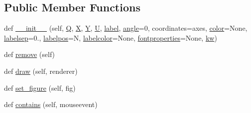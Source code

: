 \subsection*{Public Member Functions}
\begin{DoxyCompactItemize}
\item 
def \hyperlink{classmatplotlib_1_1quiver_1_1QuiverKey_a0516c2e91dcf94329df812e66b135a26}{\+\_\+\+\_\+init\+\_\+\+\_\+} (self, \hyperlink{classmatplotlib_1_1quiver_1_1QuiverKey_a87241e8441235ea44da1e26fa249c67f}{Q}, \hyperlink{classmatplotlib_1_1quiver_1_1QuiverKey_a677b96d69627db6cf8271ace161e4920}{X}, \hyperlink{classmatplotlib_1_1quiver_1_1QuiverKey_a79d4345f46bc99ce0c3d11cd1001c503}{Y}, \hyperlink{classmatplotlib_1_1quiver_1_1QuiverKey_a24e4cdf1a8fe12f3a1da49dd55dd614c}{U}, \hyperlink{classmatplotlib_1_1quiver_1_1QuiverKey_a5f746ef608190ecafe748ca3a6e79010}{label}, \hyperlink{classmatplotlib_1_1quiver_1_1QuiverKey_ab781e7037ad3d4d853fd80862f87841a}{angle}=0, coordinates=\textquotesingle{}axes\textquotesingle{}, \hyperlink{classmatplotlib_1_1quiver_1_1QuiverKey_a43b0eb9bfaf8244e74093582cc060410}{color}=None, \hyperlink{classmatplotlib_1_1quiver_1_1QuiverKey_a3e3c2f5f406415fcc575f1cb73545256}{labelsep}=0., \hyperlink{classmatplotlib_1_1quiver_1_1QuiverKey_a13fa5350971641227ee0278a9da4690f}{labelpos}=\textquotesingle{}N\textquotesingle{}, \hyperlink{classmatplotlib_1_1quiver_1_1QuiverKey_ae7b1495b7dbbbf21f6939fb433f46a21}{labelcolor}=None, \hyperlink{classmatplotlib_1_1quiver_1_1QuiverKey_af7746ad76a195c89210bbc7cd1caeb49}{fontproperties}=None, \hyperlink{classmatplotlib_1_1quiver_1_1QuiverKey_aef670dbf8f0ddb8e8b7aca95d1c0db80}{kw})
\item 
def \hyperlink{classmatplotlib_1_1quiver_1_1QuiverKey_ae03661f0e85a8135feb9e810f74be9f3}{remove} (self)
\item 
def \hyperlink{classmatplotlib_1_1quiver_1_1QuiverKey_a3aee42d47627d8c054abf11476e135f7}{draw} (self, renderer)
\item 
def \hyperlink{classmatplotlib_1_1quiver_1_1QuiverKey_af085685619c78d57c46f4669d6ed1182}{set\+\_\+figure} (self, fig)
\item 
def \hyperlink{classmatplotlib_1_1quiver_1_1QuiverKey_a419f26dc3938261d1d42e6f857d749b8}{contains} (self, mouseevent)
\end{DoxyCompactItemize}
